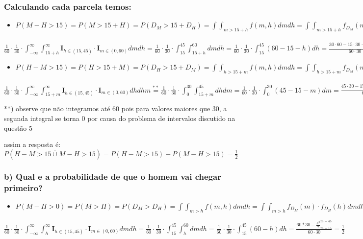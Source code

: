 \documentclass[portuguese]{article}
\begin{document}
\subsubsection*{\textmd{Calculando cada parcela temos: }}
\begin{itemize}
\item $P(M-H>15)=P(M>15+H)=P(D{}_{M}>15+D{}_{H})=\int\int_{m>15+h}f(m,h)dmdh=\int\int_{m>15+h}f_{D{}_{M}}(m)\cdot f_{D{}_{H}}(h)dmdh=$
\end{itemize}
$\frac{1}{60}\cdot\frac{1}{30}\cdot\int_{-\infty}^{\infty}\int_{15+h}^{\infty}\mathbf{I}_{h\in(15,45)}\cdot\mathbf{I}_{m\in(0,60)}dmdh=\frac{1}{60}\cdot\frac{1}{30}\cdot\int_{15}^{45}\int_{15+h}^{60}dmdh=\frac{1}{60}\cdot\frac{1}{30}\cdot\int_{15}^{45}(60-15-h)dh=\frac{30\cdot60-15\cdot30-\frac{h^{2}}{2}_{h=15}^{h=45}}{60\cdot30}=0,25$
\begin{itemize}
\item $P(H-M>15)=P(H>15+M)=P(D{}_{H}>15+D{}_{M})=\int\int_{h>15+m}f(m,h)dmdh=\int\int_{h>15+m}f_{D{}_{M}}(m)\cdot f_{D{}_{H}}(h)dmdh=$
\end{itemize}
$\frac{1}{60}\cdot\frac{1}{30}\cdot\int_{-\infty}^{\infty}\int_{15+m}^{\infty}\mathbf{I}_{h\in(15,45)}\cdot\mathbf{I}_{m\in(0,60)}dhdhm\overset{**}{=}\frac{1}{60}\cdot\frac{1}{30}\cdot\int_{0}^{30}\int_{15+m}^{45}dhdm=\frac{1}{60}\cdot\frac{1}{30}\cdot\int_{0}^{30}(45-15-m)dm=\frac{45\cdot30-15\cdot30-\frac{m^{2}}{2}_{m=0}^{m=30}}{60\cdot30}=0,25$

{*}{*}) observe que não integramos até 60 pois para valores maiores
que 30, a segunda integral se torna 0 por causa do problema de intervalos
discutido na questão 5

assim a resposta é:$P(H-M>15\overset{.}{\cup}M-H>15)=P(H-M>15)+P(M-H>15)=\frac{1}{2}$


\subsubsection*{\textmd{b) Qual e a probabilidade de que o homem vai chegar primeiro? }}
\begin{itemize}
\item $P(M-H>0)=P(M>H)=P(D{}_{M}>D{}_{H})=\int\int_{m>h}f(m,h)dmdh=\int\int_{m>h}f_{D{}_{M}}(m)\cdot f_{D{}_{H}}(h)dmdh=$
\end{itemize}
$\frac{1}{60}\cdot\frac{1}{30}\cdot\int_{-\infty}^{\infty}\int_{h}^{\infty}\mathbf{I}_{h\in(15,45)}\cdot\mathbf{I}_{m\in(0,60)}dmdh=\frac{1}{60}\cdot\frac{1}{30}\cdot\int_{15}^{45}\int_{h}^{60}dmdh=\frac{1}{60}\cdot\frac{1}{30}\cdot\int_{15}^{45}(60-h)dh=\frac{60*30-\frac{h^{2}}{2}_{m=15}^{m=45}}{60\cdot30}=\frac{1}{2}$
\end{document}
